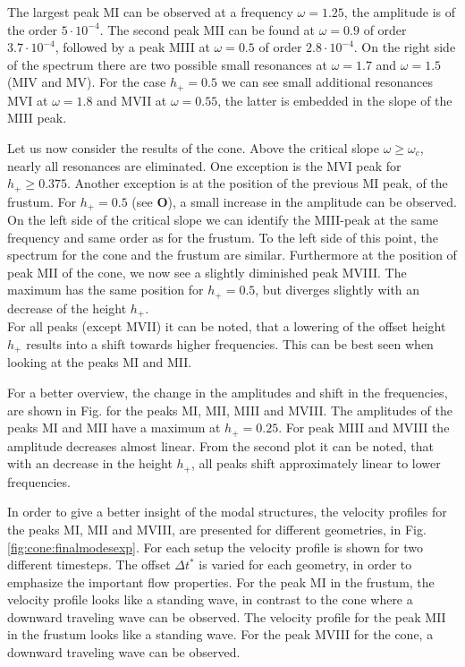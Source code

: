 The largest peak M\RN{1} can be observed at a frequency $\omega=1.25$, the amplitude is of the order $5\cdot10^{-4}$.
The second peak M\RN{2} can be found at $\omega=0.9$ of order $3.7\cdot10^{-4}$, followed by
a peak M\RN{3} at $\omega=0.5$ of order $2.8\cdot10^{-4}$.
On the right side of the spectrum there are two possible small resonances at $\omega=1.7$ and $\omega=1.5$ (M\RN{4} and M\RN{5}).
For the case $h_+=0.5$  we can see small additional resonances  M\RN{6} at $\omega=1.8$ and M\RN{7} at $\omega=0.55$,
the latter is embedded in the slope of the M\RN{3} peak.

Let us now consider the results of the cone.
Above the critical slope $\omega\geq\omega_c$, nearly all resonances are eliminated. One exception is the M\RN{6} peak for
$h_+\geq0.375$. Another exception is at the position of the previous M\RN{1} peak, of the frustum.
For $h_+=0.5$ (see \textbf{O}), a small increase in the amplitude can be observed.
On the left side of the critical slope we can identify the M\RN{3}-peak
at the same frequency and same order as for the frustum. To the left side of this point, the spectrum for
the cone and the frustum are similar.
Furthermore at the position of peak M\RN{2} of the cone, we now see a slightly diminished peak M\RN{8}.
The maximum has the same position for $h_+=0.5$, but diverges slightly with an decrease of the height $h_+$.\\
For all peaks (except M\RN{7}) it can be noted, that a lowering of the offset height $h_+$ results
into a shift towards higher frequencies. This can be best seen when looking at the peaks M\RN{1} and M\RN{2}.

For a better overview, the change in the amplitudes and shift in the frequencies, are shown in
Fig. \label{fig:cone:finalampmax} for the peaks M\RN{1}, M\RN{2}, M\RN{3} and M\RN{8}.
The amplitudes of the peaks M\RN{1} and M\RN{2} have a maximum at $h_+= 0.25$. For peak M\RN{3} and M\RN{8} the amplitude decreases almost linear.
From the second plot it can be noted, that with an decrease in the height $h_+$,
all peaks shift approximately linear to lower frequencies.

In order to give a better insight of the modal structures, the velocity profiles for the peaks M\RN{1}, M\RN{2} and M\RN{8},
are presented for different geometries, in Fig. \ref{fig:cone:finalmodesexp}.
For each setup the velocity profile is shown for two different timesteps. The offset $\Delta t^*$ is varied  for each geometry, in order to emphasize
the important flow properties.
For the peak M\RN{1} in the frustum, the velocity profile looks like a standing wave,
in contrast to the cone where a downward traveling wave can be observed.
The velocity profile for the peak M\RN{2} in the frustum looks like a standing wave.
For the peak M\RN{8} for the cone, a downward traveling wave can be observed.


